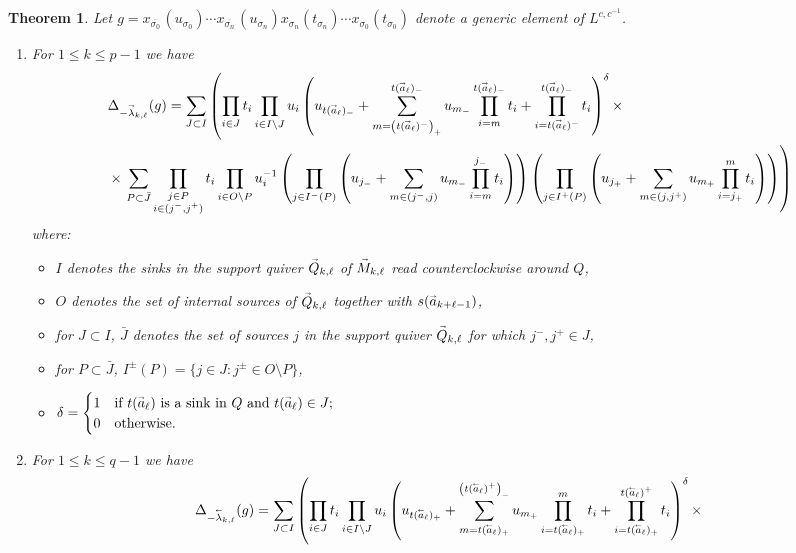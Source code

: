 \documentclass[11pt]{amsart}
\renewcommand{\vec}[1]{\accentset{\shortrightarrow}{#1}}
\newcommand{\cev}[1]{\accentset{\shortleftarrow}{#1}}
\newtheorem{theorem}{Theorem}[section]
\numberwithin{equation}{section}
\begin{document}
  {%
  \begin{theorem}
    Let $g=x_{\overline{\sigma_0\!}\,}(u_{\sigma_0})\cdots x_{\overline{\sigma_n\!}\,}(u_{\sigma_n}) x_{\sigma_n}(t_{\sigma_n}) \cdots x_{\sigma_0}(t_{\sigma_0})$ denote a generic element of $L^{c,c^{-1}}$.
    \begin{enumerate}
      \item For $1\le k\le p-1$ we have
      \begin{align}
        &\Delta_{-\vec{\lambda}_{k,\ell}}(g)=\sum_{J\subset I}\left(\prod_{i\in J} t_i\prod_{i\in I\setminus J} u_i\left(u_{t(\vec{a}_\ell)_-}+\sum_{m=\left(t(\vec{a}_\ell)^-\right)_+}^{t(\vec{a}_\ell)_-}u_{m_-}\prod_{i=m}^{t(\vec{a}_\ell)_-} t_i+\prod_{i=t(\vec{a}_\ell)^-}^{t(\vec{a}_\ell)_-}t_i\right)^\delta\times\right.\\
        \nonumber&\times\left.\sum_{P\subset\bar{J}}\prod_{\substack{j\in P\\i\in(j^-,j^+)}}t_i\prod_{i\in O\setminus P}u_i^{-1}\left(\prod_{j\in I^-(P)}\left(u_{j_-}+\sum_{m\in(j^-,j)}u_{m_-}\prod_{i=m}^{j_-} t_i\right)\right)\left(\prod_{j\in I^+(P)}\left(u_{j_+}+\sum_{m\in(j,j^+)}u_{m_+}\prod_{i=j_+}^m t_i\right)\right)\right)
      \end{align}
      where:
      \begin{itemize}
        \item $I$ denotes the sinks in the support quiver $\vec{Q}_{k,\ell}$ of $\vec{M}_{k,\ell}$ read counterclockwise around $Q$,
        \item $O$ denotes the set of internal sources of $\vec{Q}_{k,\ell}$ together with $s(\vec{a}_{k+\ell-1})$,
        \item for $J\subset I$, $\bar{J}$ denotes the set of sources $j$ in the support quiver $\vec{Q}_{k,\ell}$ for which $j^-,j^+\in J$,
        \item for $P\subset\bar{J}$, $I^\pm(P)=\{j\in J:j^\pm\in O\setminus P\}$,
        \item $\delta=\begin{cases}1 & \text{if $t(\vec{a}_\ell)$ is a sink in $Q$ and $t(\vec{a}_\ell)\in J$;}\\0 & \text{otherwise.}\end{cases}$
      \end{itemize}
      \item For $1\le k\le q-1$ we have
      \begin{align}
        &\Delta_{-\cev{\lambda}_{k,\ell}}(g)=\sum_{J\subset I}\left(\prod_{i\in J} t_i\prod_{i\in I\setminus J} u_i\left(u_{t(\cev{a}_\ell)_+}+\sum_{m=t(\cev{a}_\ell)_+}^{\left(t(\cev{a}_\ell)^+\right)_-}u_{m_+}\prod_{i=t(\cev{a}_\ell)_+}^m t_i+\prod_{i=t(\cev{a}_\ell)_+}^{t(\cev{a}_\ell)^+}t_i\right)^\delta\times\right.\\

\end{align}
\end{enumerate}
\end{theorem}}
\end{document}
